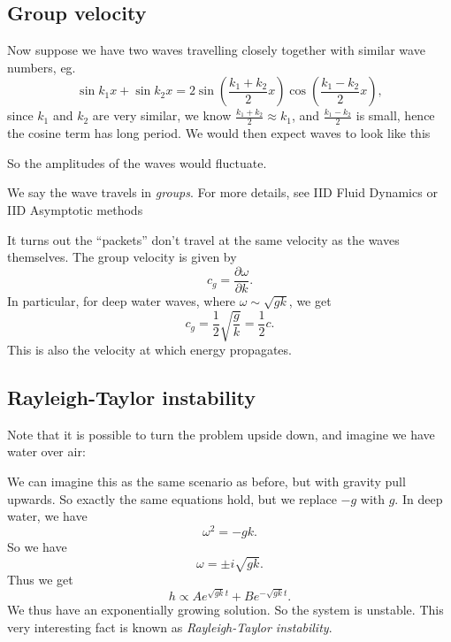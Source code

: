 \documentclass[a4paper]{article}
\begin{document}
\subsection{Group velocity}
Now suppose we have two waves travelling closely together with similar wave numbers, eg.
\[
  \sin k_1 x + \sin k_2 x = 2 \sin \left(\frac{k_1 + k_2}{2} x\right) \cos\left(\frac{k_1 - k_2}{2}x\right),
\]
since $k_1$ and $k_2$ are very similar, we know $\frac{k_1 + k_2}{2} \approx k_1$, and $\frac{k_1 - k_2}{2}$ is small, hence the cosine term has long period. We would then expect waves to look like this

So the amplitudes of the waves would fluctuate.
\begin{center}
\end{center}
We say the wave travels in \emph{groups}. For more details, see IID Fluid Dynamics or IID Asymptotic methods %

It turns out the ``packets'' don't travel at the same velocity as the waves themselves. The group velocity is given by
\[
  c_g = \frac{\partial \omega}{\partial k}.
\]
In particular, for deep water waves, where $\omega \sim \sqrt{gk}$, we get
\[
  c_g = \frac{1}{2} \sqrt{\frac{g}{k}} = \frac{1}{2}c.
\]
This is also the velocity at which energy propagates.

\subsection{Rayleigh-Taylor instability}
Note that it is possible to turn the problem upside down, and imagine we have water over air:
\begin{center}
\end{center}
We can imagine this as the same scenario as before, but with gravity pull upwards. So exactly the same equations hold, but we replace $-g$ with $g$. In deep water, we have
\[
  \omega^2 = -gk.
\]
So we have
\[
  \omega = \pm i\sqrt{gk}.
\]
Thus we get
\[
  h \propto A e^{\sqrt{gk} t} + B e^{-\sqrt{gk}t}.
\]
We thus have an exponentially growing solution. So the system is unstable. This very interesting fact is known as \emph{Rayleigh-Taylor instability}.
\end{document}
